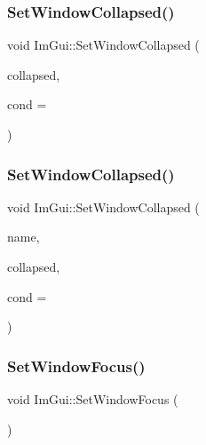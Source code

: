 \hypertarget{namespace_im_gui_ab5445711a74e0e1a58d1e464cdda252f}{}\label{namespace_im_gui_ab5445711a74e0e1a58d1e464cdda252f} 
\subsubsection{\texorpdfstring{Set\+Window\+Collapsed()}{SetWindowCollapsed()}\hspace{0.1cm}{\footnotesize\ttfamily [1/2]}}
{\footnotesize\ttfamily void Im\+Gui\+::\+Set\+Window\+Collapsed (\begin{DoxyParamCaption}\item[{bool}]{collapsed,  }\item[{Im\+Gui\+Cond}]{cond = {} }\end{DoxyParamCaption})}

\hypertarget{namespace_im_gui_ac349187d6aae141cd3b4476e54bcc338}{}\label{namespace_im_gui_ac349187d6aae141cd3b4476e54bcc338} 
\subsubsection{\texorpdfstring{Set\+Window\+Collapsed()}{SetWindowCollapsed()}\hspace{0.1cm}{\footnotesize\ttfamily [2/2]}}
{\footnotesize\ttfamily void Im\+Gui\+::\+Set\+Window\+Collapsed (\begin{DoxyParamCaption}\item[{const char $\ast$}]{name,  }\item[{bool}]{collapsed,  }\item[{Im\+Gui\+Cond}]{cond = {} }\end{DoxyParamCaption})}

\hypertarget{namespace_im_gui_ac71920931ed7b7c8594ee84c6a94e7b8}{}\label{namespace_im_gui_ac71920931ed7b7c8594ee84c6a94e7b8} 
\subsubsection{\texorpdfstring{Set\+Window\+Focus()}{SetWindowFocus()}\hspace{0.1cm}{\footnotesize\ttfamily [1/2]}}
{\footnotesize\ttfamily void Im\+Gui\+::\+Set\+Window\+Focus (\begin{DoxyParamCaption}{ }\end{DoxyParamCaption})}

